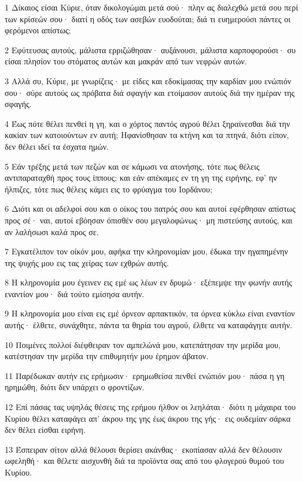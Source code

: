 \par 1 Δίκαιος είσαι Κύριε, όταν δικολογώμαι μετά σού· πλην ας διαλεχθώ μετά σου περί των κρίσεών σου· διατί η οδός των ασεβών ευοδούται; διά τι ευημερούσι πάντες οι φερόμενοι απίστως;
\par 2 Εφύτευσας αυτούς, μάλιστα ερριζώθησαν· αυξάνουσι, μάλιστα καρποφορούσι· συ είσαι πλησίον του στόματος αυτών και μακράν από των νεφρών αυτών.
\par 3 Αλλά συ, Κύριε, με γνωρίζεις· με είδες και εδοκίμασας την καρδίαν μου ενώπιόν σου· σύρε αυτούς ως πρόβατα διά σφαγήν και ετοίμασον αυτούς διά την ημέραν της σφαγής.
\par 4 Έως πότε θέλει πενθεί η γη, και ο χόρτος παντός αγρού θέλει ξηραίνεσθαι διά την κακίαν των κατοιούντων εν αυτή; Ηφανίσθησαν τα κτήνη και τα πτηνά, διότι είπον, δεν θέλει ιδεί τα έσχατα ημών.
\par 5 Εάν τρέξης μετά των πεζών και σε κάμωσι να ατονήσης, τότε πως θέλεις αντιπαραταχθή προς τους ίππους; και εάν απέκαμες εν τη γη της ειρήνης, εφ' ην ήλπιζες, τότε πως θέλεις κάμει εις το φρύαγμα του Ιορδάνου;
\par 6 Διότι και οι αδελφοί σου και ο οίκος του πατρός σου και αυτοί εφέρθησαν απίστως προς σέ· ναι, αυτοί εβόησαν όπισθέν σου μεγαλοφώνως· μη πιστεύσης αυτούς, και αν λαλήσωσι καλά προς σε.
\par 7 Εγκατέλιπον τον οίκόν μου, αφήκα την κληρονομίαν μου, έδωκα την ηγαπημένην της ψυχής μου εις τας χείρας των εχθρών αυτής.
\par 8 Η κληρονομία μου έγεινεν εις εμέ ως λέων εν δρυμώ· εξέπεμψε την φωνήν αυτής εναντίον μου· διά τούτο εμίσησα αυτήν.
\par 9 Η κληρονομία μου είναι εις εμέ όρνεον αρπακτικόν, τα όρνεα κύκλω είναι εναντίον αυτής· έλθετε, συνάχθητε, πάντα τα θηρία του αγρού, έλθετε να καταφάγητε αυτήν.
\par 10 Ποιμένες πολλοί διέφθειραν τον αμπελώνά μου, κατεπάτησαν την μερίδα μου, κατέστησαν την μερίδα την επιθυμητήν μου έρημον άβατον.
\par 11 Παρέδωκαν αυτήν εις ερήμωσιν· ερημωθείσα πενθεί ενώπιόν μου· πάσα η γη ηρημώθη, διότι δεν υπάρχει ο φροντίζων.
\par 12 Επί πάσας τας υψηλάς θέσεις της ερήμου ήλθον οι λεηλάται· διότι η μάχαιρα του Κυρίου θέλει καταφάγει απ' άκρου της γης έως άκρου της γής· εις ουδεμίαν σάρκα δεν θέλει είσθαι ειρήνη.
\par 13 Έσπειραν σίτον αλλά θέλουσι θερίσει ακάνθας· εκοπίασαν αλλά δεν θέλουσιν ωφεληθή· και θέλετε αισχυνθή διά τα προϊόντα σας από του φλογερού θυμού του Κυρίου.
